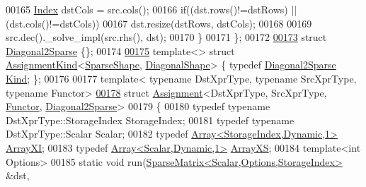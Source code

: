 \begin{DoxyCode}
00165     \hyperlink{namespace_eigen_a62e77e0933482dafde8fe197d9a2cfde}{Index} dstCols = src.cols();
00166     \textcolor{keywordflow}{if}((dst.rows()!=dstRows) || (dst.cols()!=dstCols))
00167       dst.resize(dstRows, dstCols);
00168 
00169     src.dec().\_solve\_impl(src.rhs(), dst);
00170   \}
00171 \};
00172 
\hyperlink{struct_eigen_1_1internal_1_1_diagonal2_sparse}{00173} \textcolor{keyword}{struct }\hyperlink{struct_eigen_1_1internal_1_1_diagonal2_sparse}{Diagonal2Sparse} \{\};
00174 
\hyperlink{struct_eigen_1_1internal_1_1_assignment_kind_3_01_sparse_shape_00_01_diagonal_shape_01_4}{00175} \textcolor{keyword}{template}<> \textcolor{keyword}{struct }\hyperlink{struct_eigen_1_1internal_1_1_assignment_kind}{AssignmentKind}<\hyperlink{struct_eigen_1_1_sparse_shape}{SparseShape},
      \hyperlink{struct_eigen_1_1_diagonal_shape}{DiagonalShape}> \{ \textcolor{keyword}{typedef} \hyperlink{struct_eigen_1_1internal_1_1_diagonal2_sparse}{Diagonal2Sparse} \hyperlink{struct_eigen_1_1internal_1_1_diagonal2_sparse}{Kind}; \};
00176 
00177 \textcolor{keyword}{template}< \textcolor{keyword}{typename} DstXprType, \textcolor{keyword}{typename} SrcXprType, \textcolor{keyword}{typename} Functor>
\hyperlink{struct_eigen_1_1internal_1_1_assignment_3_01_dst_xpr_type_00_01_src_xpr_type_00_01_functor_00_01_diagonal2_sparse_01_4}{00178} \textcolor{keyword}{struct }\hyperlink{struct_eigen_1_1internal_1_1_assignment}{Assignment}<DstXprType, SrcXprType, \hyperlink{struct_functor}{Functor}, 
      \hyperlink{struct_eigen_1_1internal_1_1_diagonal2_sparse}{Diagonal2Sparse}>
00179 \{
00180   \textcolor{keyword}{typedef} \textcolor{keyword}{typename} DstXprType::StorageIndex StorageIndex;
00181   \textcolor{keyword}{typedef} \textcolor{keyword}{typename} DstXprType::Scalar Scalar;
00182   \textcolor{keyword}{typedef} \hyperlink{group___core___module_class_eigen_1_1_array}{Array<StorageIndex,Dynamic,1>} \hyperlink{group___core___module_class_eigen_1_1_array}{ArrayXI};
00183   \textcolor{keyword}{typedef} \hyperlink{group___core___module_class_eigen_1_1_array}{Array<Scalar,Dynamic,1>} \hyperlink{group___core___module_class_eigen_1_1_array}{ArrayXS};
00184   \textcolor{keyword}{template}<\textcolor{keywordtype}{int} Options>
00185   \textcolor{keyword}{static} \textcolor{keywordtype}{void} run(\hyperlink{group___sparse_core___module_class_eigen_1_1_sparse_matrix}{SparseMatrix<Scalar,Options,StorageIndex>} &dst, \textcolor{keyword}{
}
\end{DoxyCode}
